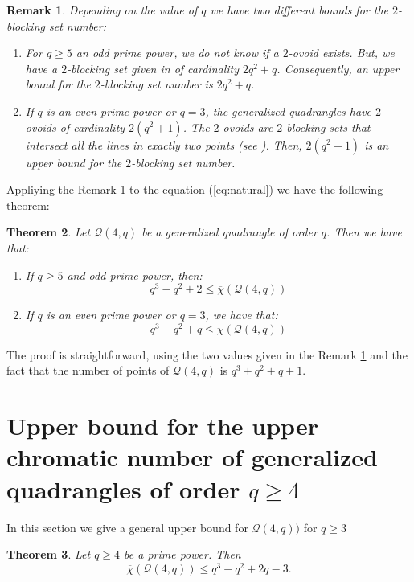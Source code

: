 \documentclass[12pt]{article}
\newtheorem{theorem}{Theorem}[section]
\newtheorem{remark}[theorem]{Remark}
\begin{document}
\begin{remark}\label{2blocking}
 Depending on the value of $q$ we have two different bounds for the $2$-blocking set number:
\begin{enumerate}
\item For $q\geq 5$ an odd prime power, we do not know if a $2$-ovoid exists. But, we have a $2$-blocking set given in \cite{fmo23} of cardinality $2q^2+q$. Consequently, an upper bound for the $2$-blocking set number is $2q^2+q$.
\item If $q$ is an even prime power or $q=3$, the generalized quadrangles have {\it{$2$-ovoids}} of cardinality $2(q^2+1)$. The {\it{$2$-ovoids}} are $2$-blocking sets that intersect all the lines in exactly two points (see \cite{2ovoid}). Then, $2(q^2+1)$ is an upper bound for the $2$-blocking set number.
\end{enumerate}
\end{remark}

Appliying the Remark \ref{2blocking} to the equation (\ref{eq:natural}) we have the following theorem: 

\begin{theorem}\label{lowerboundsthm} Let $\mathcal{Q}(4,q)$ be a generalized quadrangle of order $q$. Then we have that:
\begin{enumerate}
    \item If $q\geq 5$ and odd prime power, then:
$$q^3-q^2+2\le \overline{\chi}(\mathcal{Q}(4,q))$$

\item If $q$ is an even prime power or $q=3$, we have that: 
$$q^3-q^2+q\le\overline{\chi}(\mathcal{Q}(4,q))$$
\end{enumerate}
\end{theorem}

The proof is straightforward, using the two values given in the Remark \ref{2blocking} and the fact that the number of points of $\mathcal{Q}(4,q)$ is $q^3+q^2+q+1$. 


\section{Upper bound for the upper chromatic number of generalized quadrangles of order $q\ge4$}
\label{upperbound}

In this section we give a general upper bound for $\mathcal{Q}(4,q))$ for $q\geq 3$


\begin{theorem}\label{upperboundthm} Let $q\geq 4$ be a prime power. Then 
$$\overline{\chi}(\mathcal{Q}(4,q))\le q^3-q^2+2q-3.$$
\end{theorem}
\end{document}

